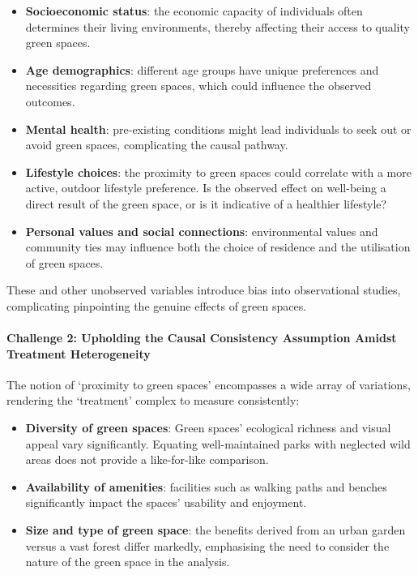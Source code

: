 \documentclass[
  singlecolumn]{article}
\let\oldparagraph\paragraph
\renewcommand{\paragraph}[1]{\oldparagraph{#1}\mbox{}}
\providecommand{\tightlist}{%
  \setlength{\itemsep}{0pt}\setlength{\parskip}{0pt}}\usepackage{longtable,booktabs,array}
\begin{document}
\begin{itemize}
\tightlist
\item
  \textbf{Socioeconomic status}: the economic capacity of individuals
  often determines their living environments, thereby affecting their
  access to quality green spaces.
\item
  \textbf{Age demographics}: different age groups have unique
  preferences and necessities regarding green spaces, which could
  influence the observed outcomes.
\item
  \textbf{Mental health}: pre-existing conditions might lead individuals
  to seek out or avoid green spaces, complicating the causal pathway.
\item
  \textbf{Lifestyle choices}: the proximity to green spaces could
  correlate with a more active, outdoor lifestyle preference. Is the
  observed effect on well-being a direct result of the green space, or
  is it indicative of a healthier lifestyle?
\item
  \textbf{Personal values and social connections}: environmental values
  and community ties may influence both the choice of residence and the
  utilisation of green spaces.
\end{itemize}

These and other unobserved variables introduce bias into observational
studies, complicating pinpointing the genuine effects of green spaces.

\paragraph{Challenge 2: Upholding the Causal Consistency Assumption
Amidst Treatment
Heterogeneity}\label{challenge-2-upholding-the-causal-consistency-assumption-amidst-treatment-heterogeneity}

The notion of `proximity to green spaces' encompasses a wide array of
variations, rendering the `treatment' complex to measure consistently:

\begin{itemize}
\tightlist
\item
  \textbf{Diversity of green spaces}: Green spaces' ecological richness
  and visual appeal vary significantly. Equating well-maintained parks
  with neglected wild areas does not provide a like-for-like comparison.
\item
  \textbf{Availability of amenities}: facilities such as walking paths
  and benches significantly impact the spaces' usability and enjoyment.
\item
  \textbf{Size and type of green space}: the benefits derived from an
  urban garden versus a vast forest differ markedly, emphasising the
  need to consider the nature of the green space in the analysis.
\end{itemize}
\end{document}
